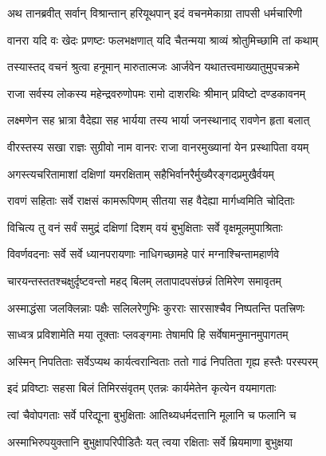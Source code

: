 
\twolineshloka
{अथ तानब्रवीत् सर्वान् विश्रान्तान् हरियूथपान्}
{इदं वचनमेकाग्रा तापसी धर्मचारिणी} %

\twolineshloka
{वानरा यदि वः खेदः प्रणष्टः फलभक्षणात्}
{यदि चैतन्मया श्राव्यं श्रोतुमिच्छामि तां कथाम्} %

\twolineshloka
{तस्यास्तद् वचनं श्रुत्वा हनूमान् मारुतात्मजः}
{आर्जवेन यथातत्त्वमाख्यातुमुपचक्रमे} %

\twolineshloka
{राजा सर्वस्य लोकस्य महेन्द्रवरुणोपमः}
{रामो दाशरथिः श्रीमान् प्रविष्टो दण्डकावनम्} %

\twolineshloka
{लक्ष्मणेन सह भ्रात्रा वैदेह्या सह भार्यया}
{तस्य भार्या जनस्थानाद् रावणेन हृता बलात्} %

\twolineshloka
{वीरस्तस्य सखा राज्ञः सुग्रीवो नाम वानरः}
{राजा वानरमुख्यानां येन प्रस्थापिता वयम्} %

\twolineshloka
{अगस्त्यचरितामाशां दक्षिणां यमरक्षिताम्}
{सहैभिर्वानरैर्मुख्यैरङ्गदप्रमुखैर्वयम्} %

\twolineshloka
{रावणं सहिताः सर्वे राक्षसं कामरूपिणम्}
{सीतया सह वैदेह्या मार्गध्वमिति चोदिताः} %

\twolineshloka
{विचित्य तु वनं सर्वं समुद्रं दक्षिणां दिशम्}
{वयं बुभुक्षिताः सर्वे वृक्षमूलमुपाश्रिताः} %

\twolineshloka
{विवर्णवदनाः सर्वे सर्वे ध्यानपरायणाः}
{नाधिगच्छामहे पारं मग्नाश्चिन्तामहार्णवे} %

\twolineshloka
{चारयन्तस्ततश्चक्षुर्दृष्टवन्तो महद् बिलम्}
{लतापादपसंछन्नं तिमिरेण समावृतम्} %

\twolineshloka
{अस्माद्धंसा जलक्लिन्नाः पक्षैः सलिलरेणुभिः}
{कुरराः सारसाश्चैव निष्पतन्ति पतत्त्रिणः} %

\twolineshloka
{साध्वत्र प्रविशामेति मया तूक्ताः प्लवङ्गमाः}
{तेषामपि हि सर्वेषामनुमानमुपागतम्} %

\twolineshloka
{अस्मिन् निपतिताः सर्वेऽप्यथ कार्यत्वरान्विताः}
{ततो गाढं निपतिता गृह्य हस्तैः परस्परम्} %

\twolineshloka
{इदं प्रविष्टाः सहसा बिलं तिमिरसंवृतम्}
{एतन्नः कार्यमेतेन कृत्येन वयमागताः} %

\twolineshloka
{त्वां चैवोपगताः सर्वे परिद्यूना बुभुक्षिताः}
{आतिथ्यधर्मदत्तानि मूलानि च फलानि च} %

\twolineshloka
{अस्माभिरुपयुक्तानि बुभुक्षापरिपीडितैः}
{यत् त्वया रक्षिताः सर्वे म्रियमाणा बुभुक्षया} %

